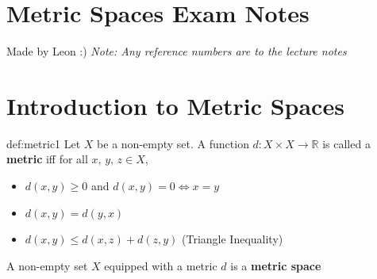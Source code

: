 \documentclass[landscape, 8pt]{extarticle}
\begin{document}
\setlength{\abovedisplayskip}{3.5pt}
\setlength{\belowdisplayskip}{3.5pt}
\setlength{\abovedisplayshortskip}{3.5pt}
\setlength{\belowdisplayshortskip}{3.5pt}

\begin{multicols}{3}
\raggedcolumns


\section*{\huge Metric Spaces Exam Notes}
Made by Leon :) \textit{Note: Any reference numbers are to the lecture notes}

\vspace{-5pt}
\section{Introduction to Metric Spaces}

\begin{dfn}{def:metric}{1}
    \vspace{-5pt}
    Let $X$ be a non-empty set. A function $d: X \times X \to \mathbb{R} $ is called a \textbf{metric} iff for all $x,\,y,\,z\in X$,
    \vspace{-3pt}
    \begin{itemize}
        \item $d(x,y)\ge 0$ and $d(x,y)=0 \iff x = y$
        \item $d(x,y)=d(y,x)$
        \item $d(x,y)\le d(x,z)+d(z,y)$ (Triangle Inequality)
    \end{itemize}
    \vspace{-5pt}
    A non-empty set $X$ equipped with a metric $d$ is a \textbf{metric space}
\end{dfn}


\end{multicols}
\end{document}
